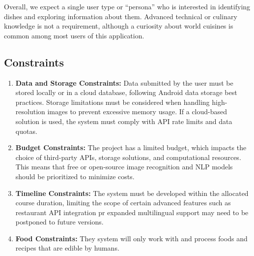 \documentclass[]{article}
\begin{document}
Overall, we expect a single user type or “persona” who is interested in identifying dishes and exploring information about them. Advanced technical or culinary knowledge is not a requirement, although a curiosity about world cuisines is common among most users of this application.

\subsection{Constraints}
\label{sub:constraints}
\begin{enumerate}
	\item \textbf{Data and Storage Constraints: }Data submitted by the user must be stored locally or in a cloud database, following Android data storage best practices. Storage limitations must be considered when handling high-resolution images to prevent excessive memory usage. If a cloud-based solution is used, the system must comply with API rate limits and data quotas.
	\item \textbf{Budget Constraints: }The project has a limited budget, which impacts the choice of third-party APIs, storage solutions, and computational resources. This means that free or open-source image recognition and NLP models should be prioritized to minimize costs.
	\item \textbf{Timeline Constraints: }The system must be developed within the allocated course duration, limiting the scope of certain advanced features such as restaurant API integration pr expanded multilingual support may need to be postponed to future versions.
	\item \textbf{Food Constraints: } They system will only work with and process foods and recipes that are edible by humans.
\end{enumerate}
\end{document}
